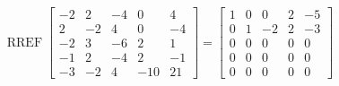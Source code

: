 \begin{exerciseAnswer} 


\[\operatorname{RREF} \left[\begin{array}{ccccc}
-2 & 2 & -4 & 0 & 4 \\
2 & -2 & 4 & 0 & -4 \\
-2 & 3 & -6 & 2 & 1 \\
-1 & 2 & -4 & 2 & -1 \\
-3 & -2 & 4 & -10 & 21
\end{array}\right] = \left[\begin{array}{ccccc}
1 & 0 & 0 & 2 & -5 \\
0 & 1 & -2 & 2 & -3 \\
0 & 0 & 0 & 0 & 0 \\
0 & 0 & 0 & 0 & 0 \\
0 & 0 & 0 & 0 & 0
\end{array}\right] \]



\end{exerciseAnswer}
